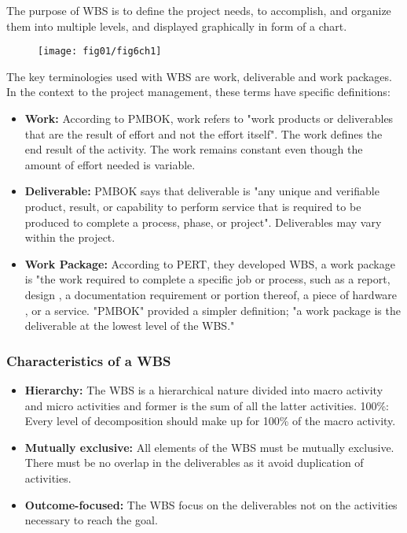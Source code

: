 The purpose of WBS\cite{WBSs} is to define the project needs, to accomplish, and organize them into multiple levels, and displayed graphically in form of a chart.

 \begin{figure}
	\centering
	\texttt{[image: fig01/fig6ch1]}
\end{figure}
 
The key terminologies used with WBS are work, deliverable and work packages. In the context to the project management, these terms have specific definitions:
\begin{itemize}
    \item \textbf{Work:} According to PMBOK, work refers to "work products or deliverables that are the result of effort and not the effort itself". The work defines the end result of the activity. The work remains constant even though the amount of effort needed is variable.
    \item \textbf{Deliverable:} PMBOK says that deliverable is "any unique and verifiable product, result, or capability to perform service that is required to be produced to complete a process, phase, or project". Deliverables may vary within the project.
    \item \textbf{Work Package:} According to PERT, they developed WBS, a work package is  "the work required to complete a specific job or process, such as a report, design , a documentation requirement or portion thereof, a piece of hardware , or a service. "PMBOK" provided a simpler definition; "a work package is the deliverable at the lowest level of the WBS."
\end{itemize}

\subsubsection{ \textbf{Characteristics of a WBS} }

\begin{itemize}
    \item \textbf{Hierarchy:} The WBS is a hierarchical nature divided into macro activity and micro activities and former is the sum of all the latter activities.
100\%: Every level of decomposition should make up for 100\% of the macro activity.
    \item \textbf{Mutually exclusive:} All elements of the WBS must be mutually exclusive. There must be no overlap in the deliverables as it avoid duplication of activities.
    \item \textbf{Outcome-focused:}  The WBS focus on the deliverables not on the activities necessary to reach the goal.
\end{itemize}


